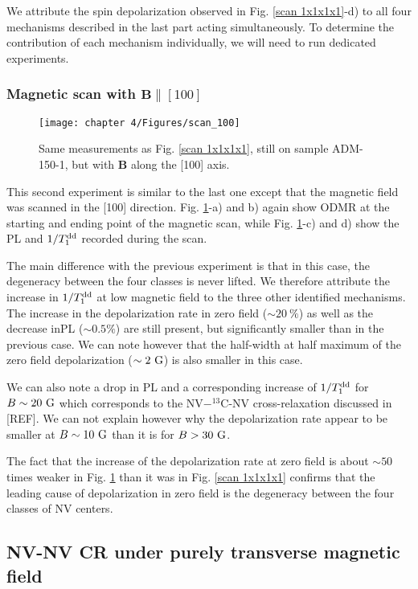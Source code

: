 \documentclass[a4paper, 11pt]{book}
\begin{document}
We attribute the spin depolarization observed in Fig. \ref{scan 1x1x1x1}-d) to all four mechanisms described in the last part acting simultaneously. To determine the contribution of each mechanism individually, we will need to run dedicated experiments.

\subsubsection{Magnetic scan with $\mathbf{B} \parallel [100]$}

\begin{figure}[h]
\centering
\texttt{[image: chapter 4/Figures/scan\_100]}
\caption{Same measurements as Fig. \ref{scan 1x1x1x1}, still on sample ADM-150-1, but with $\mathbf{B}$ along the [100] axis.}
\label{scan 100}
\end{figure}

This second experiment is similar to the last one except that the magnetic field was scanned in the [100] direction. Fig. \ref{scan 100}-a) and b) again show ODMR at the starting and ending point of the magnetic scan, while Fig. \ref{scan 100}-c) and d) show the PL and $1/T_1^{\rm dd}$ recorded during the scan.

The main difference with the previous experiment is that in this case, the degeneracy between the four classes is never lifted. We therefore attribute the increase in $1/T_1^{\rm dd}$ at low magnetic field to the three other identified mechanisms. The increase in the depolarization rate in zero field ($\sim 20\ \%$) as well as the decrease inPL ($\sim 0.5 \%$) are still present, but significantly smaller than in the previous case. We can note however that the half-width at half maximum of the zero field depolarization ($\sim 2\ \rm G$) is also smaller in this case.

We can also note a drop in PL and a corresponding increase of $1/T_1^{\rm dd}$ for $B \sim 20\ \rm G$ which corresponds to the NV$-^{13}$C-NV cross-relaxation discussed in [REF]. We can not explain however why the depolarization rate appear to be smaller at $B \sim 10\ \rm G$ than it is for $B > 30\ \rm G$.

The fact that the increase of the depolarization rate at zero field is about $\sim 50$ times weaker in Fig. \ref{scan 100} than it was in Fig. \ref{scan 1x1x1x1} confirms that the leading cause of depolarization in zero field is the degeneracy between the four classes of NV centers. 

\subsection{NV-NV CR under purely transverse magnetic field}
\end{document}
